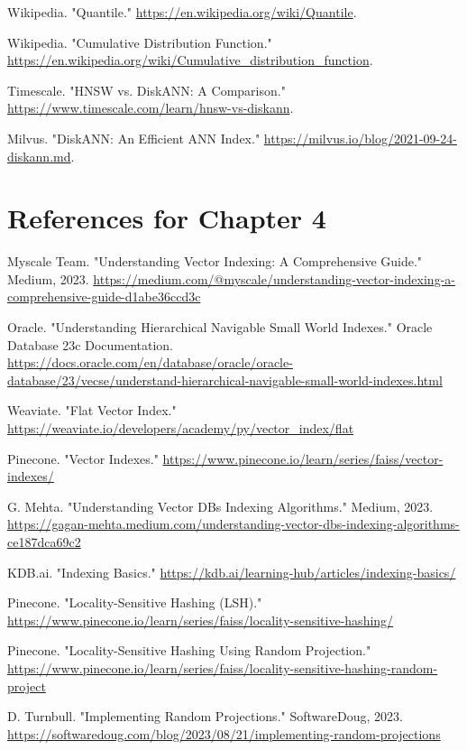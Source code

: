 \documentclass[12pt,a4paper,twoside,openright,justified]{book}
\begin{document}
\begin{thebibliography}{99}
Wikipedia. "Quantile."  
\url{https://en.wikipedia.org/wiki/Quantile}.

Wikipedia. "Cumulative Distribution Function."  
\url{https://en.wikipedia.org/wiki/Cumulative_distribution_function}.

Timescale. "HNSW vs. DiskANN: A Comparison."  
\url{https://www.timescale.com/learn/hnsw-vs-diskann}.

Milvus. "DiskANN: An Efficient ANN Index."  
\url{https://milvus.io/blog/2021-09-24-diskann.md}.


\section*{References for Chapter 4}
Myscale Team. "Understanding Vector Indexing: A Comprehensive Guide." Medium, 2023. \url{https://medium.com/@myscale/understanding-vector-indexing-a-comprehensive-guide-d1abe36ccd3c}

Oracle. "Understanding Hierarchical Navigable Small World Indexes." Oracle Database 23c Documentation. \url{https://docs.oracle.com/en/database/oracle/oracle-database/23/vecse/understand-hierarchical-navigable-small-world-indexes.html}

Weaviate. "Flat Vector Index." \url{https://weaviate.io/developers/academy/py/vector_index/flat}

Pinecone. "Vector Indexes." \url{https://www.pinecone.io/learn/series/faiss/vector-indexes/}

G. Mehta. "Understanding Vector DBs Indexing Algorithms." Medium, 2023. \url{https://gagan-mehta.medium.com/understanding-vector-dbs-indexing-algorithms-ce187dca69c2}

KDB.ai. "Indexing Basics." \url{https://kdb.ai/learning-hub/articles/indexing-basics/}

Pinecone. "Locality-Sensitive Hashing (LSH)." \url{https://www.pinecone.io/learn/series/faiss/locality-sensitive-hashing/}

Pinecone. "Locality-Sensitive Hashing Using Random Projection." \url{https://www.pinecone.io/learn/series/faiss/locality-sensitive-hashing-random-project}

D. Turnbull. "Implementing Random Projections." SoftwareDoug, 2023. \url{https://softwaredoug.com/blog/2023/08/21/implementing-random-projections}


\end{thebibliography}
\end{document}
